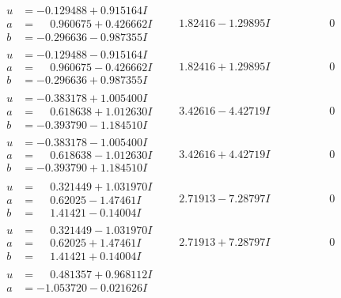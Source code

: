 \documentclass[1p]{elsarticle_modified}
\theoremstyle{definition}
\begin{document}
$$\begin{array}{c|c|c}
 \hline 
\begin{aligned}
u &= -0.129488 + 0.915164 I \\
a &= \phantom{-}0.960675 + 0.426662 I \\
b &= -0.296636 - 0.987355 I\end{aligned}
 & \phantom{-}1.82416 - 1.29895 I & \phantom{-0.000000 } 0 \\ \hline\begin{aligned}
u &= -0.129488 - 0.915164 I \\
a &= \phantom{-}0.960675 - 0.426662 I \\
b &= -0.296636 + 0.987355 I\end{aligned}
 & \phantom{-}1.82416 + 1.29895 I & \phantom{-0.000000 } 0 \\ \hline\begin{aligned}
u &= -0.383178 + 1.005400 I \\
a &= \phantom{-}0.618638 + 1.012630 I \\
b &= -0.393790 - 1.184510 I\end{aligned}
 & \phantom{-}3.42616 - 4.42719 I & \phantom{-0.000000 } 0 \\ \hline\begin{aligned}
u &= -0.383178 - 1.005400 I \\
a &= \phantom{-}0.618638 - 1.012630 I \\
b &= -0.393790 + 1.184510 I\end{aligned}
 & \phantom{-}3.42616 + 4.42719 I & \phantom{-0.000000 } 0 \\ \hline\begin{aligned}
u &= \phantom{-}0.321449 + 1.031970 I \\
a &= \phantom{-}0.62025 - 1.47461 I \\
b &= \phantom{-}1.41421 - 0.14004 I\end{aligned}
 & \phantom{-}2.71913 - 7.28797 I & \phantom{-0.000000 } 0 \\ \hline\begin{aligned}
u &= \phantom{-}0.321449 - 1.031970 I \\
a &= \phantom{-}0.62025 + 1.47461 I \\
b &= \phantom{-}1.41421 + 0.14004 I\end{aligned}
 & \phantom{-}2.71913 + 7.28797 I & \phantom{-0.000000 } 0 \\ \hline\begin{aligned}
u &= \phantom{-}0.481357 + 0.968112 I \\
a &= -1.053720 - 0.021626 I \\

\end{aligned}
\end{array}$$
\end{document}
